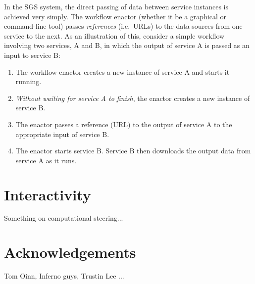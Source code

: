\documentclass{llncs}
\begin{document}
%
In the SGS system, the direct passing of data between service instances is achieved very simply.  The workflow enactor (whether it be a graphical or command-line tool) passes {\em references\/} (i.e.\ URLs) to the data sources from one service to the next.  As an illustration of this, consider a simple workflow involving two services, A and B, in which the output of service A is passed as an input to service B:
\begin{enumerate}
	\item The workflow enactor creates a new instance of service A and starts it running.
	\item {\em Without waiting for service A to finish\/}, the enactor creates a new instance of service B.
	\item The enactor passes a reference (URL) to the output of service A to the appropriate input of service B.
	\item The enactor starts service B.  Service B then downloads the output data from service A as it runs.
\end{enumerate}

%


\section{Interactivity} \label{sec:interactivity}
Something on computational steering...


\section*{Acknowledgements}
Tom Oinn, Inferno guys, Trustin Lee ...
%
%


\end{document}
